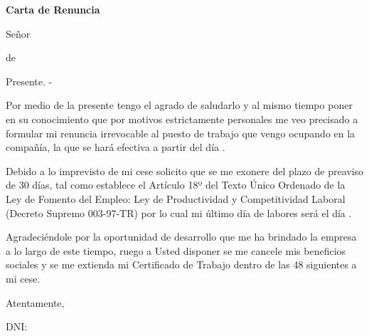 \documentclass{letter}
\newcommand\receiverBegin[0]{Señor}
\newcommand\receiverBegin[0]{Señora}
\newcommand\exonerationMessage[0]{
  Debido a lo imprevisto de mi cese solicito que se me exonere del plazo de preaviso de 30 días, tal como establece el Artículo 18º del Texto Único Ordenado de la Ley de Fomento del Empleo: Ley de Productividad y Competitividad Laboral (Decreto Supremo 003-97-TR) por lo cual mi último día de labores será el día \resignationStartDate.}
\newcommand\exonerationMessage[0]{}
\begin{document}
\begin{center}
\textbf{Carta de Renuncia}
\bigskip\noindent
\end{center}

\begin{flushright}
\cityDate
\end{flushright}

\begin{flushleft}

\receiverBegin \xspace \receiverName

\jobTitle \xspace de \businessName

Presente. -

Por medio de la presente tengo el agrado de saludarlo y al mismo tiempo poner en su conocimiento que por motivos estrictamente personales me veo precisado a formular mi renuncia irrevocable al puesto de trabajo que vengo ocupando en la compañía, la que se hará efectiva a partir del día \resignationStartDate.

\exonerationMessage

Agradeciéndole por la oportunidad de desarrollo que me ha brindado la empresa a lo largo de este tiempo, ruego a Usted disponer se me cancele mis beneficios sociales y se me extienda mi Certificado de Trabajo dentro de las 48 siguientes a mi cese.

Atentamente,

\begin{flushright}
\underline{\hspace{4cm}}

DNI: \docNumber

\fullName

\end{flushright}

\end{flushleft}
\end{document}
